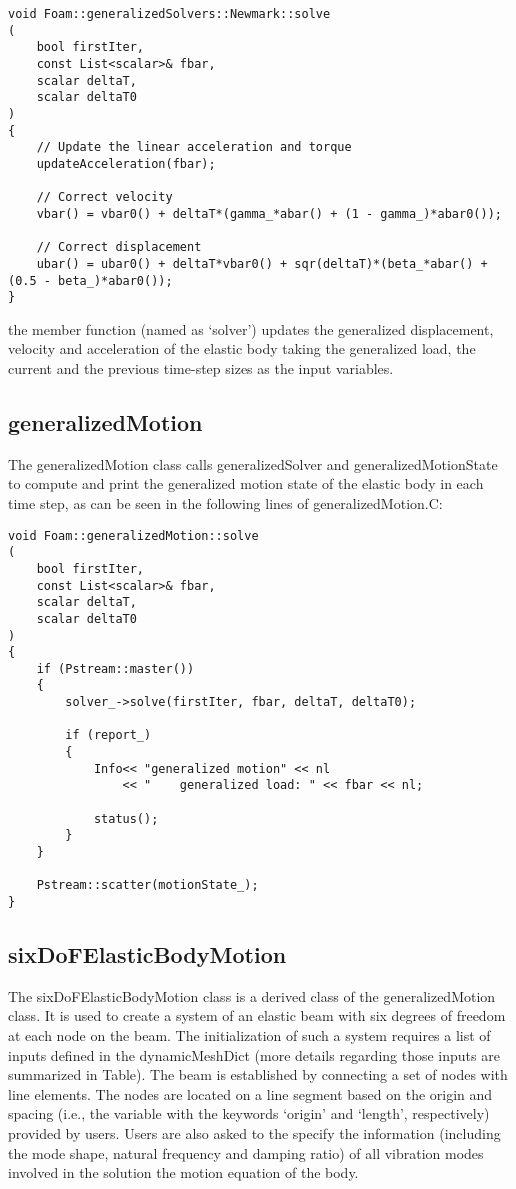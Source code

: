 \begin{lstlisting}
void Foam::generalizedSolvers::Newmark::solve
(
    bool firstIter,
    const List<scalar>& fbar,
    scalar deltaT,
    scalar deltaT0
)
{
    // Update the linear acceleration and torque
    updateAcceleration(fbar);

    // Correct velocity
    vbar() = vbar0() + deltaT*(gamma_*abar() + (1 - gamma_)*abar0());

    // Correct displacement
    ubar() = ubar0() + deltaT*vbar0() + sqr(deltaT)*(beta_*abar() + (0.5 - beta_)*abar0());
}
\end{lstlisting}

\noindent the member function (named as `solver') updates the generalized displacement, velocity and acceleration of the elastic body taking the generalized load, the current and the previous time-step sizes as the input variables.

\subsection{generalizedMotion}

The generalizedMotion class calls generalizedSolver and generalizedMotionState to compute and print the generalized motion state of the elastic body in each time step, as can be seen in the following lines of generalizedMotion.C:

\begin{lstlisting}
void Foam::generalizedMotion::solve
(
    bool firstIter,
    const List<scalar>& fbar,
    scalar deltaT,
    scalar deltaT0
)
{
    if (Pstream::master())
    {
        solver_->solve(firstIter, fbar, deltaT, deltaT0); 

        if (report_)
        {
            Info<< "generalized motion" << nl
                << "    generalized load: " << fbar << nl;

            status();
        }
    }

    Pstream::scatter(motionState_);
}
\end{lstlisting}

\subsection{sixDoFElasticBodyMotion}

The sixDoFElasticBodyMotion class is a derived class of the generalizedMotion class. It is used to create a system of an elastic beam with six degrees of freedom at each node on the beam. The initialization of such a system requires a list of inputs defined in the dynamicMeshDict (more details regarding those inputs are summarized in Table). The beam is established by connecting a set of nodes with line elements. The nodes are located on a line segment based on the origin and spacing (i.e., the variable with the keywords `origin' and `length', respectively) provided by users. Users are also asked to the specify the information (including the mode shape, natural frequency and damping ratio) of all vibration modes involved in the solution the motion equation of the body.

